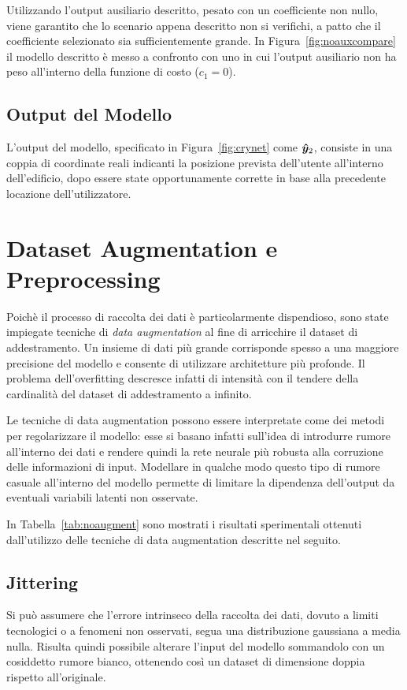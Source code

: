 Utilizzando l'output ausiliario descritto, pesato con un coefficiente non
nullo, viene garantito che lo scenario appena descritto non si verifichi, a
patto che il coefficiente selezionato sia sufficientemente grande. In
Figura~\ref{fig:noauxcompare} il modello descritto è messo a confronto con uno
in cui l'output ausiliario non ha peso all'interno della funzione di costo
(\(c_1 = 0\)).




\subsection{Output del Modello}
L'output del modello, specificato in Figura~\ref{fig:crynet} come \(\bm\hat{\bm y}_2\),
consiste in una coppia di coordinate reali indicanti la posizione prevista
dell'utente all'interno dell'edificio, dopo essere state opportunamente
corrette in base alla precedente locazione dell'utilizzatore.
\section{Dataset Augmentation e Preprocessing}\label{sec:augmentation}
Poichè il processo di raccolta dei dati è particolarmente dispendioso, sono
state impiegate tecniche di \emph{data augmentation} al fine di arricchire il
dataset di addestramento. Un insieme di dati più grande corrisponde spesso a
una maggiore precisione del modello e consente di utilizzare architetture più
profonde. Il problema dell'overfitting descresce infatti di intensità con il
tendere della cardinalità del dataset di addestramento a infinito.

Le tecniche di data augmentation possono essere interpretate come dei metodi
per regolarizzare il modello: esse si basano infatti sull'idea di introdurre rumore
all'interno dei dati e rendere quindi la rete neurale più robusta alla
corruzione delle informazioni di input. Modellare in qualche modo questo tipo
di rumore casuale all'interno del modello permette di limitare la dipendenza
dell'output da eventuali variabili latenti non osservate.

In Tabella~\ref{tab:noaugment} sono mostrati i risultati sperimentali ottenuti
dall'utilizzo delle tecniche di data augmentation descritte nel seguito.


\subsection{Jittering}
Si può assumere che l'errore intrinseco della raccolta dei dati, dovuto a
limiti tecnologici o a fenomeni non osservati, segua una distribuzione
gaussiana a media nulla. Risulta quindi possibile alterare l'input del
modello sommandolo con un cosiddetto rumore bianco, ottenendo così un dataset
di dimensione doppia rispetto all'originale. 

